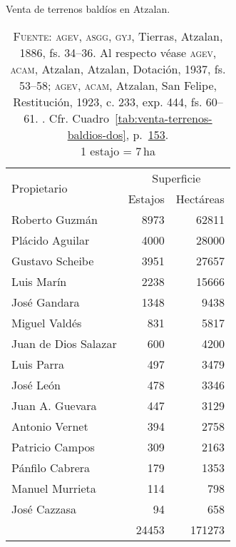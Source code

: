 \documentclass[14pt,twoside,final]{extbook} %
\begin{document}
\begin{table}%
\centering
\caption[Venta de terrenos baldíos en Atzalan]{Venta de terrenos baldíos en Atzalan.}
\tlfstyle
\begin{tabular}{@{}lrr@{}}
\toprule
\multirow{2}{*}{Propietario} & \multicolumn{2}{c}{Superficie} \\ %
\cmidrule{2-3}
{} & Estajos\textsu{*} & Hectáreas \\
\midrule
Roberto Guzmán\index[nombres]{Guzman, Roberto@Guzmán, Roberto} & 8973 & 62811 \\
Plácido Aguilar\index[nombres]{Aguilar, Placido@Aguilar, Plácido} & 4000 & 28000 \\
Gustavo Scheibe\index[nombres]{Scheibe, Gustavo} & 3951 & 27657 \\
Luis Marín\index[nombres]{Marin, Luis@Marín, Luis} & 2238 & 15666 \\
José Gandara\index[nombres]{Gandara, Jose@Gandara, José} & 1348 & 9438 \\
Miguel Valdés\index[nombres]{Valdes, Miguel@Valdés, Miguel} & 831 & 5817 \\
Juan de Dios Salazar\index[nombres]{Salazar, Juan de Dios} & 600 & 4200 \\
Luis Parra\index[nombres]{Parra, Luis} & 497 & 3479 \\
José León\index[nombres]{Leon, Jose@León, José} & 478 & 3346 \\
Juan A. Guevara\index[nombres]{Guevara, Juan A.} & 447 & 3129 \\
Antonio Vernet\index[nombres]{Vernet, Antonio} & 394 & 2758 \\
Patricio Campos\index[nombres]{Campos, Patricio} & 309 & 2163 \\
Pánfilo Cabrera\index[nombres]{Cabrera, Panfilo@Cabrera, Pánfilo} & 179 & 1353 \\
Manuel Murrieta\index[nombres]{Murrieta, Manuel} & 114 & 798 \\
José Cazzasa\index[nombres]{Cazzasa, Jose@Cazzasa, José} & 94 & 658 \\
\midrule
{} & 24453 & 171273 \\
\bottomrule
\end{tabular}
\caption*{\textsc{Fuente:} \textsc{agev, asgg, gyj}, Tierras, Atzalan, 1886, fs. 34--36. Al respecto véase \textsc{agev, acam}, Atzalan, Atzalan, Dotación, 1937, fs. 53--58; \textsc{agev, acam}, Atzalan, San Felipe, Restitución, 1923, c. 233, exp. 444, fs. 60--61.  . Cfr. Cuadro~\ref{tab:venta-terrenos-baldios-dos}, p.~\hyperref[tab:venta-terrenos-baldios-dos]{153}. \\ \textsu{*} 1 estajo = 7\,ha}
\label{tab:venta-terrenos-baldios}
\end{table}
\end{document}
